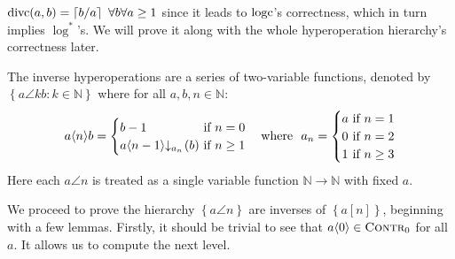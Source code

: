 $\text{divc}(a, b) = \left\lceil b/a \right\rceil \ \forall b\forall a\ge 1$ since it leads to $\text{logc}$'s correctness, which in turn implies $\log^*$'s. We will prove it along with the whole hyperoperation hierarchy's correctness later.
\begin{defn} \label{defn: inv-hyperop}
	The inverse hyperoperations are a series of two-variable functions, denoted by $\left\{a\angle{k}b : k\in \mathbb{N}\right\}$ where for all $a, b, n\in \mathbb{N}$:
	\begin{equation}
	a\angle{n}b = \begin{cases}
	b - 1 & \hspace{-10pt}\text{ if } n = 0 \\
	\cdt{a\angle{n-1}}{a_n}(b) & \hspace{-10pt}\text{ if } n \ge 1
	\end{cases}
	\ \ \text{ where } \ a_n = \begin{cases}
	a & \hspace{-10pt}\text{ if } n = 1 \\
	0 & \hspace{-10pt}\text{ if } n = 2 \\
	1 & \hspace{-10pt}\text{ if } n \ge 3
	\end{cases}
	\end{equation}
	Here each $a\angle{n}$ is treated as a single variable function $\mathbb{N}\to \mathbb{N}$ with fixed $a$.
\end{defn}
We proceed to prove the hierarchy $\left\{a\angle{n}\right\}$ are inverses of $\left\{a[n]\right\}$, beginning with a few lemmas. Firstly, it should be trivial to see that $a\langle 0\rangle\in \text{\scshape{Contr}}_0$ for all $a$. It allows us to compute the next level.

